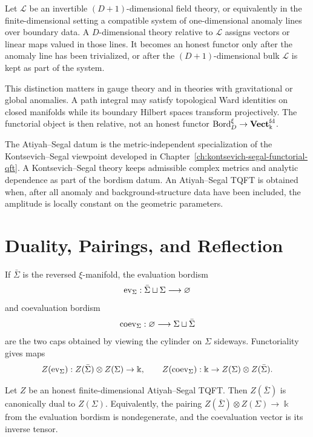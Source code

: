 \begin{definition}
\label{def:anomalous-relative-tqft}
Let \(\mathcal L\) be an invertible \((D+1)\)-dimensional field theory, or
equivalently in the finite-dimensional setting a compatible system of
one-dimensional anomaly lines over boundary data.  A \(D\)-dimensional theory
relative to \(\mathcal L\) assigns vectors or linear maps valued in those
lines.  It becomes an honest functor only after the anomaly line has been
trivialized, or after the \((D+1)\)-dimensional bulk \(\mathcal L\) is kept
as part of the system.
\end{definition}

This distinction matters in gauge theory and in theories with gravitational
or global anomalies.  A path integral may satisfy topological Ward identities
on closed manifolds while its boundary Hilbert spaces transform projectively.
The functorial object is then relative, not an honest functor
\(\operatorname{Bord}^{\xi}_{D}\to{\bf Vect}_{\Bbbk}^{\rm fd}\).

The Atiyah--Segal datum is the metric-independent specialization of the
Kontsevich--Segal viewpoint developed in
Chapter~\ref{ch:kontsevich-segal-functorial-qft}.  A
Kontsevich--Segal theory keeps admissible complex metrics and analytic
dependence as part of the bordism datum.  An Atiyah--Segal TQFT is obtained
when, after all anomaly and background-structure data have been included, the
amplitude is locally constant on the geometric parameters.

\section{Duality, Pairings, and Reflection}

If \(\bar\Sigma\) is the reversed \(\xi\)-manifold, the evaluation bordism
\[
  {\rm ev}_\Sigma:\bar\Sigma\sqcup\Sigma\longrightarrow\varnothing
\]
and coevaluation bordism
\[
  {\rm coev}_\Sigma:\varnothing\longrightarrow
  \Sigma\sqcup\bar\Sigma
\]
are the two caps obtained by viewing the cylinder on \(\Sigma\) sideways.
Functoriality gives maps
\[
  Z({\rm ev}_\Sigma):
  Z(\bar\Sigma)\otimes Z(\Sigma)\to\Bbbk,
  \qquad
  Z({\rm coev}_\Sigma):
  \Bbbk\to Z(\Sigma)\otimes Z(\bar\Sigma).
\]

\begin{proposition}
\label{prop:tqft-state-space-duality}
Let \(Z\) be an honest finite-dimensional Atiyah--Segal TQFT.  Then
\(Z(\bar\Sigma)\) is canonically dual to \(Z(\Sigma)\).  Equivalently, the
pairing \(Z(\bar\Sigma)\otimes Z(\Sigma)\to\Bbbk\) from the evaluation
bordism is nondegenerate, and the coevaluation vector is its inverse tensor.
\end{proposition}

